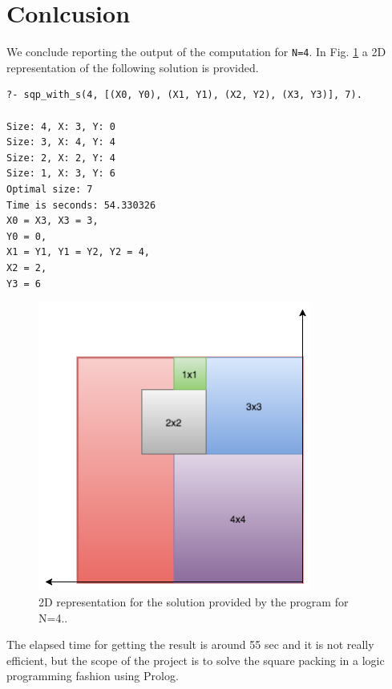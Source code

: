 \documentclass{article}
\begin{document}
\section{Conlcusion}

We conclude reporting the output of the computation for \texttt{N=4}. In Fig. \ref{fig:sqp} a 2D representation of the following solution is provided.

\begin{verbatim}
?- sqp_with_s(4, [(X0, Y0), (X1, Y1), (X2, Y2), (X3, Y3)], 7).

Size: 4, X: 3, Y: 0
Size: 3, X: 4, Y: 4
Size: 2, X: 2, Y: 4
Size: 1, X: 3, Y: 6
Optimal size: 7
Time is seconds: 54.330326
X0 = X3, X3 = 3,
Y0 = 0,
X1 = Y1, Y1 = Y2, Y2 = 4,
X2 = 2,
Y3 = 6 
\end{verbatim}

\begin{figure}[h]
\includegraphics[width=0.8\textwidth]{sqpn4}
\caption{2D representation for the solution provided by the program for N=4..}
\label{fig:sqp}
\end{figure}

The elapsed time for getting the result is around 55 sec and it is not really efficient, but the scope of the project is to solve the square packing in a logic programming fashion using Prolog.
\end{document}
